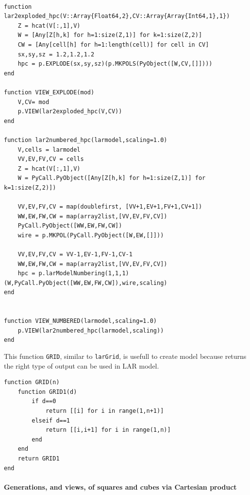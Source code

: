 \documentclass{article}
\begin{document}
\begin{flushleft}
\begin{list}{}{}
\begin{Verbatim}[tabsize=4]
	
function lar2exploded_hpc(V::Array{Float64,2},CV::Array{Array{Int64,1},1})
	Z = hcat(V[:,1],V)
	W = [Any[Z[h,k] for h=1:size(Z,1)] for k=1:size(Z,2)]
	CW = [Any[cell[h] for h=1:length(cell)] for cell in CV]
	sx,sy,sz = 1.2,1.2,1.2
	hpc = p.EXPLODE(sx,sy,sz)(p.MKPOLS(PyObject([W,CV,[]])))
end
	
function VIEW_EXPLODE(mod)
	V,CV= mod
	p.VIEW(lar2exploded_hpc(V,CV))
end

function lar2numbered_hpc(larmodel,scaling=1.0)
	V,cells = larmodel
	VV,EV,FV,CV = cells
	Z = hcat(V[:,1],V)
	W = PyCall.PyObject([Any[Z[h,k] for h=1:size(Z,1)] for k=1:size(Z,2)])

	VV,EV,FV,CV = map(doublefirst, [VV+1,EV+1,FV+1,CV+1])
	WW,EW,FW,CW = map(array2list,[VV,EV,FV,CV])
	PyCall.PyObject([WW,EW,FW,CW])
	wire = p.MKPOL(PyCall.PyObject([W,EW,[]]))

	VV,EV,FV,CV = VV-1,EV-1,FV-1,CV-1
	WW,EW,FW,CW = map(array2list,[VV,EV,FV,CV])
	hpc = p.larModelNumbering(1,1,1)(W,PyCall.PyObject([WW,EW,FW,CW]),wire,scaling)
end


function VIEW_NUMBERED(larmodel,scaling=1.0) 
	p.VIEW(lar2numbered_hpc(larmodel,scaling))
end

\end{Verbatim}
\end{list}
\end{flushleft}
\vspace{2ex}
This function \texttt{GRID}, similar to \texttt{larGrid}, is usefull to create model because returns the right type of output can be used in LAR model.

\begin{flushleft} \small
\begin{list}{}{} \item
   \begin{Verbatim}[tabsize=4]
function GRID(n)
    function GRID1(d)
        if d==0 
            return [[i] for i in range(1,n+1)]
        elseif d==1 
            return [[i,i+1] for i in range(1,n)] 
        end
    end
    return GRID1
end
   \end{Verbatim}
\end{list}
\end{flushleft}
\paragraph{Generations, and views, of squares and cubes via Cartesian product}
\end{document}
